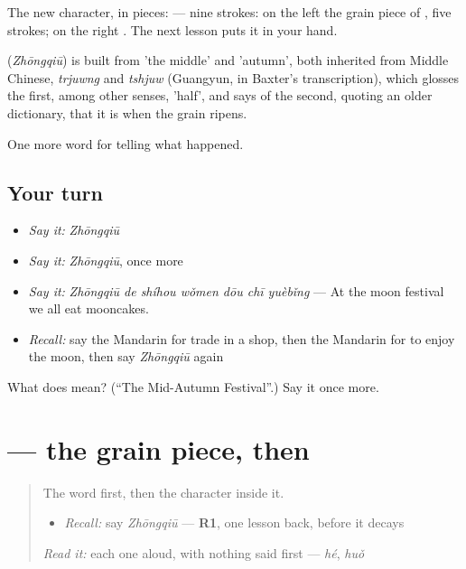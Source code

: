 The new character, in pieces:  — nine strokes: on the left the grain piece of , five strokes; on the right . The next lesson puts it in your hand.

\begin{cousinweb}
\textbf{} (\emph{Zhōngqiū}) is built from  'the middle' and  'autumn', both inherited from Middle Chinese, \emph{trjuwng} and \emph{tshjuw} (Guangyun, in Baxter's transcription), which glosses the first, among other senses, 'half', and says of the second, quoting an older dictionary, that it is when the grain ripens.
\end{cousinweb}

\begin{grammarlens}[title={What you've built}]
One more word for telling what happened.
\end{grammarlens}

\subsection*{Your turn}
\begin{itemize}
\raggedright
  \item \emph{Say it:} \emph{Zhōngqiū}
  \item \emph{Say it:} \emph{Zhōngqiū}, once more
  \item \emph{Say it:} \emph{Zhōngqiū de shíhou wǒmen dōu chī yuèbǐng} — At the moon festival we all eat mooncakes.
  \item \emph{Recall:} say the Mandarin for trade in a shop, then the Mandarin for to enjoy the moon, then say \emph{Zhōngqiū} again
\end{itemize}

\begin{tcolorbox}[breakable,colback=teal!4,colframe=teal!35!black,title={Before you move on}]
What does  mean? (\textquotedblleft{}The Mid-Autumn Festival\textquotedblright{}.) Say it once more.
\end{tcolorbox}
\section[\texorpdfstring{\zh{秋} (qiū)}{秋 (qiū)}]{ — the grain piece, then }

\label{lesson:ZH-W342-qiu-autumn}



\begin{quote}
The word first, then the character inside it.

\begin{itemize}
\raggedright
  \item \emph{Recall:} say \emph{Zhōngqiū} — \textbf{R1}, one lesson back, before it decays
\end{itemize}

\begin{quote}
 
\end{quote}

\emph{Read it:} each one aloud, with nothing said first — \emph{hé}, \emph{huǒ}
\end{quote}

